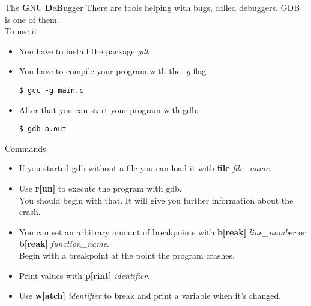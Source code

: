 \begin{frame}[fragile]{The \textbf{G}NU \textbf{D}e\textbf{B}ugger}
	There are tools helping with bugs, called debuggers. GDB is one of them.\\
	\bigskip
	To use it
	\begin{itemize}
		\item You have to install the package \textit{gdb}\\
		\item You have to compile your program with the \textit{-g} flag
		\begin{lstlisting}[numbers=none]
$ gcc -g main.c
\end{lstlisting}
		\item After that you can start your program with gdb:
		\begin{lstlisting}[numbers=none]
$ gdb a.out
\end{lstlisting}
	\end{itemize}
\end{frame}


\begin{frame}{Commands}
	\begin{itemize}
		\item If you started gdb without a file you can load it with \textbf{file} \textit{file\_name}.
		\item Use \textbf{r[un]} to execute the program with gdb.\\
		You should begin with that. It will give you further information about the crash.
		\item You can set an arbitrary amount of breakpoints with \textbf{b[reak]} \textit{line\_number} or \textbf{b[reak]} \textit{function\_name}.\\
		Begin with a breakpoint at the point the program crashes.
		\item Print values with \textbf{p[rint]} \textit{identifier}.
		\item Use \textbf{w[atch]} \textit{identifier} to break and print a variable when it's changed.
	\end{itemize}
\end{frame}


